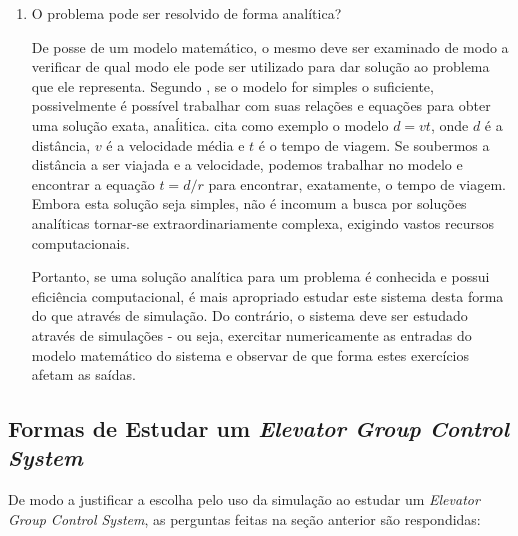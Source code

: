 \begin{enumerate}
\item O problema pode ser resolvido de forma analítica?

De posse de um modelo matemático, o mesmo deve ser examinado de modo a verificar de qual modo ele pode ser utilizado para dar solução ao problema que ele representa. Segundo \cite{Law}, se o modelo for simples o suficiente, possivelmente é possível trabalhar com suas relações e equações para obter uma solução exata, anaĺitica. \cite{Law} cita como exemplo o modelo $d = vt$, onde $d$ é a distância, $v$ é a velocidade média e $t$ é o tempo de viagem. Se soubermos a distância a ser viajada e a velocidade, podemos trabalhar no modelo e encontrar a equação $t = d/r$ para encontrar, exatamente, o tempo de viagem. Embora esta solução seja simples, não é incomum a busca por soluções analíticas tornar-se extraordinariamente complexa, exigindo vastos recursos computacionais.

Portanto, se uma solução analítica para um problema é conhecida e possui eficiência computacional, é mais apropriado estudar este sistema desta forma do que através de simulação. Do contrário, o sistema deve ser estudado através de simulações - ou seja, exercitar numericamente as entradas do modelo matemático do sistema e observar de que forma estes exercícios afetam as saídas.
\end{enumerate}

\subsection{Formas de Estudar um \textit{Elevator Group Control System}}

De modo a justificar a escolha pelo uso da simulação ao estudar um \textit{Elevator Group Control System}, as perguntas feitas na seção anterior são respondidas:

